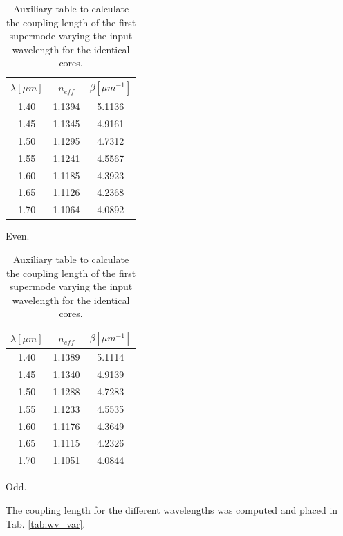 \documentclass[a4paper,12pt]{article}
\begin{document}
\begin{table}[H]
    \centering
    \begin{subtable}{0.45\textwidth}
        \centering
        \begin{tabular}{ccc}
            \toprule
            $\lambda [\mu m]$ & $n_{eff}$ & $\beta [\mu m^{-1}]$ \\
            \midrule
            1.40 & 1.1394 & 5.1136 \\
            1.45 & 1.1345 & 4.9161 \\
            1.50 & 1.1295 & 4.7312 \\
            1.55 & 1.1241 & 4.5567 \\
            1.60 & 1.1185 & 4.3923 \\
            1.65 & 1.1126 & 4.2368 \\
            1.70 & 1.1064 & 4.0892 \\
            \bottomrule
        \end{tabular}
        \caption{Even.}
    \end{subtable}
    \hfill
    \begin{subtable}{0.45\textwidth}
        \centering
        \begin{tabular}{ccc}
            \toprule
            $\lambda [\mu m]$ & $n_{eff}$ & $\beta [\mu m^{-1}]$ \\
            \midrule
            1.40 & 1.1389 & 5.1114 \\
            1.45 & 1.1340 & 4.9139 \\
            1.50 & 1.1288 & 4.7283 \\
            1.55 & 1.1233 & 4.5535 \\
            1.60 & 1.1176 & 4.3649 \\
            1.65 & 1.1115 & 4.2326 \\
            1.70 & 1.1051 & 4.0844 \\
            \bottomrule
        \end{tabular}
        \caption{Odd.}
    \end{subtable}
    \caption{Auxiliary table to calculate the coupling length of the first supermode varying the input wavelength for the identical cores.}
    \label{tab:wv_var_aux}
\end{table}

The coupling length for the different wavelengths was computed and placed in Tab. \ref{tab:wv_var}.
\end{document}
